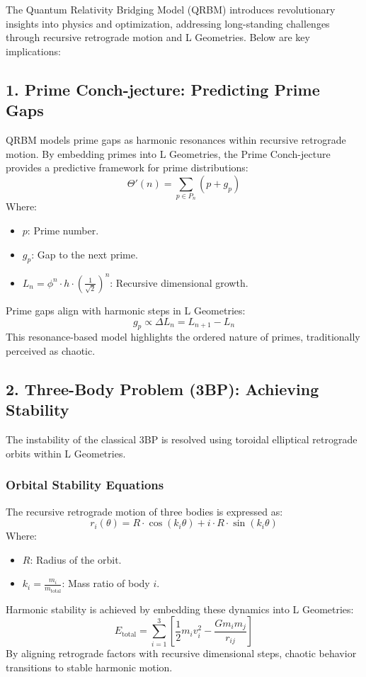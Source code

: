 \documentclass{article}
\begin{document}
The Quantum Relativity Bridging Model (QRBM) introduces revolutionary insights into physics and optimization, addressing long-standing challenges through recursive retrograde motion and L Geometries. Below are key implications:

\subsection*{1. Prime Conch-jecture: Predicting Prime Gaps}
QRBM models prime gaps as harmonic resonances within recursive retrograde motion. By embedding primes into L Geometries, the Prime Conch-jecture provides a predictive framework for prime distributions:
\[
\Theta'(n) = \sum_{p \in P_n} (p + g_p)
\]
Where:
\begin{itemize}
    \item \(p\): Prime number.
    \item \(g_p\): Gap to the next prime.
    \item \(L_n = \phi^n \cdot h \cdot \left( \frac{1}{\sqrt{2}} \right)^n\): Recursive dimensional growth.
\end{itemize}

Prime gaps align with harmonic steps in L Geometries:
\[
g_p \propto \Delta L_n = L_{n+1} - L_n
\]
This resonance-based model highlights the ordered nature of primes, traditionally perceived as chaotic.

\subsection*{2. Three-Body Problem (3BP): Achieving Stability}
The instability of the classical 3BP is resolved using toroidal elliptical retrograde orbits within L Geometries.

\subsubsection*{Orbital Stability Equations}
The recursive retrograde motion of three bodies is expressed as:
\[
r_i(\theta) = R \cdot \cos(k_i \theta) + i \cdot R \cdot \sin(k_i \theta)
\]
Where:
\begin{itemize}
    \item \(R\): Radius of the orbit.
    \item \(k_i = \frac{m_i}{m_{\text{total}}}\): Mass ratio of body \(i\).
\end{itemize}

Harmonic stability is achieved by embedding these dynamics into L Geometries:
\[
E_{\text{total}} = \sum_{i=1}^3 \left[ \frac{1}{2} m_i v_i^2 - \frac{G m_i m_j}{r_{ij}} \right]
\]
By aligning retrograde factors with recursive dimensional steps, chaotic behavior transitions to stable harmonic motion.
\end{document}
